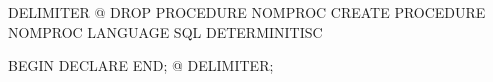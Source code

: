 DELIMITER @
DROP PROCEDURE NOMPROC
CREATE PROCEDURE NOMPROC
LANGUAGE SQL
DETERMINITISC

BEGIN 
	DECLARE
END;
@
DELIMITER;
